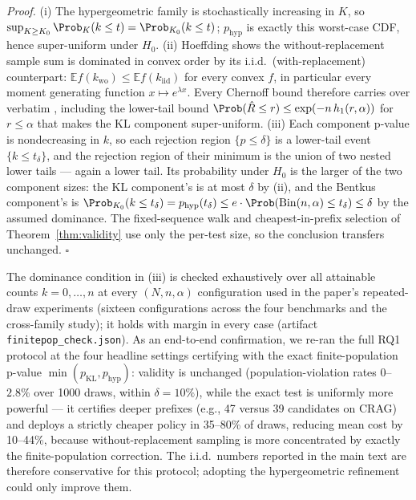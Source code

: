 \emph{Proof.} (i) The hypergeometric family is stochastically
increasing in $K$, so $\sup_{K \ge K_0} \Prob_K(k \le t) =
\Prob_{K_0}(k \le t)$; $p_{\mathrm{hyp}}$ is exactly this worst-case
CDF, hence super-uniform under $H_0$. (ii) Hoeffding
\citep[Theorem~4]{hoeffding1963probability} shows the
without-replacement sample sum is dominated in convex order by its
i.i.d.\ (with-replacement) counterpart: $\mathbb{E} f(k_{\mathrm{wo}})
\le \mathbb{E} f(k_{\mathrm{iid}})$ for every convex $f$, in
particular every moment generating function $x \mapsto e^{\lambda x}$.
Every Chernoff bound therefore carries over verbatim
\citep{bardenet2015concentration}, including the lower-tail bound
$\Prob(\hat R \le r) \le \exp(-n\,h_1(r, \alpha))$ for $r \le \alpha$
that makes the KL component super-uniform. (iii) Each component
p-value is nondecreasing in $k$, so each rejection region
$\{p \le \delta\}$ is a lower-tail event $\{k \le t_\delta\}$, and the
rejection region of their minimum is the union of two nested lower
tails --- again a lower tail. Its probability under $H_0$ is the
larger of the two component sizes: the KL component's is at most
$\delta$ by (ii), and the Bentkus component's is
$\Prob_{K_0}(k \le t_\delta) = p_{\mathrm{hyp}}(t_\delta) \le
e \cdot \Prob(\mathrm{Bin}(n,\alpha) \le t_\delta) \le \delta$ by the
assumed dominance. The fixed-sequence walk and cheapest-in-prefix
selection of Theorem~\ref{thm:validity} use only the per-test size,
so the conclusion transfers unchanged. \hfill$\square$

The dominance condition in (iii) is checked exhaustively over all
attainable counts $k = 0, \dots, n$ at every $(N, n, \alpha)$
configuration used in the paper's repeated-draw experiments (sixteen
configurations across the four benchmarks and the cross-family study);
it holds with margin in every case (artifact
\texttt{finitepop\_check.json}). As an end-to-end confirmation, we
re-ran the full RQ1 protocol at the four headline settings certifying
with the exact finite-population p-value
$\min(p_{\mathrm{KL}}, p_{\mathrm{hyp}})$: validity is unchanged
(population-violation rates $0$--$2.8\%$ over 1000 draws, within
$\delta = 10\%$), while the exact test is uniformly more powerful ---
it certifies deeper prefixes (e.g., 47 versus 39 candidates on CRAG)
and deploys a strictly cheaper policy in 35--80\% of draws, reducing
mean cost by 10--44\%, because without-replacement sampling is more
concentrated by exactly the finite-population correction. The i.i.d.\
numbers reported in the main text are therefore conservative for this
protocol; adopting the hypergeometric refinement could only improve
them.

